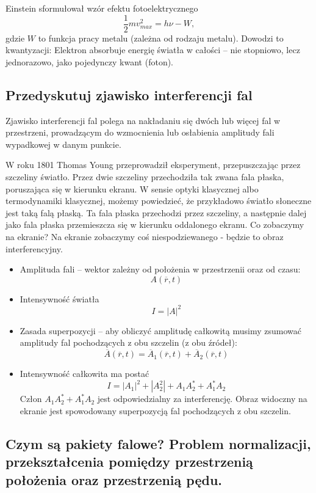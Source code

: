 Einstein sformułował wzór efektu fotoelektrycznego
\begin{equation*}
\frac12 m v_{max}^2 = h \nu - W,
\end{equation*}
gdzie $W$ to funkcja pracy metalu (zależna od rodzaju metalu). Dowodzi to kwantyzacji: Elektron absorbuje energię światła w całości – nie stopniowo, lecz jednorazowo, jako pojedynczy kwant (foton).

\subsection{Przedyskutuj zjawisko interferencji fal}

Zjawisko interferencji fal polega na nakładaniu się dwóch lub więcej fal w przestrzeni, prowadzącym do wzmocnienia lub osłabienia amplitudy fali wypadkowej w danym punkcie.

W roku 1801 Thomas Young przeprowadził eksperyment, przepuszczając
przez szczeliny światło. Przez dwie szczeliny przechodziła tak zwana fala płaska, poruszająca się w kierunku ekranu. W sensie optyki klasycznej albo termodynamiki klasycznej, możemy powiedzieć, że przykładowo światło słoneczne jest taką falą płaską. Ta fala płaska przechodzi przez szczeliny, a następnie dalej jako fala płaska przemieszcza się w kierunku oddalonego ekranu. Co zobaczymy na ekranie? Na ekranie zobaczymy coś niespodziewanego - będzie to obraz interferencyjny.

\begin{itemize}
\item Amplituda fali -- wektor zależny od położenia w przestrzenii oraz od czasu: $$A(\overline{r}, t)$$
\item Intensywność światła
$$I = |A|^2$$
\item Zasada superpozycji -- aby obliczyć amplitudę całkowitą musimy zsumować amplitudy fal pochodzących z obu szczelin (z obu źródeł):
$$\overline{A}(\overline{r}, t) = \overline{A}_1(\overline{r}, t) + \overline{A}_2(\overline{r}, t)$$
\item Intensywność całkowita ma postać
$$I = |A_1|^2 + |A_2^2| + A_1 A_2^{*} + A_1^{*} A_2$$
Człon $A_1 A_2^{*} + A_1^{*} A_2$ jest odpowiedzialny za interferencję. Obraz widoczny na ekranie jest spowodowany superpozycją fal pochodzących z obu szczelin.
\end{itemize}

\subsection{Czym są pakiety falowe? Problem normalizacji, przekształcenia pomiędzy przestrzenią położenia oraz przestrzenią pędu.}

